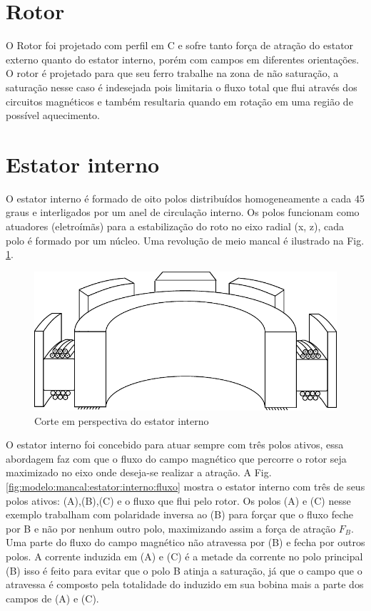 
\section{Rotor}

O Rotor foi projetado com perfil em C e sofre tanto força de atração do estator externo quanto do estator interno, porém com campos em diferentes orientações. O rotor é projetado para que seu ferro trabalhe na zona de não saturação, a saturação nesse caso é indesejada pois limitaria o fluxo total que flui através dos circuitos magnéticos e também resultaria quando em rotação em uma região de possível aquecimento.

\section{Estator interno}

O estator interno é formado de oito polos distribuídos homogeneamente a cada 45 graus e interligados por um anel de circulação interno. Os polos funcionam como atuadores (eletroímãs) para a estabilização do roto no eixo radial (x, z),  cada polo é formado por um núcleo. Uma revolução de meio mancal é ilustrado na Fig. \ref{fig:modelo:mancal:estator:interno}. 

\begin{figure}[ht!]
	\centering
	\includegraphics[width=1\linewidth]{./Figs/modelo_mancal_estator_interno}
	\caption{Corte em perspectiva do estator interno}
	\label{fig:modelo:mancal:estator:interno}
\end{figure}

O estator interno foi concebido para atuar sempre com três polos ativos, essa abordagem faz com que o fluxo do campo magnético que percorre o rotor seja maximizado no eixo onde deseja-se realizar a atração. A Fig. \ref{fig:modelo:mancal:estator:interno:fluxo} mostra o estator interno com três de seus polos ativos: (A),(B),(C) e o fluxo que flui pelo rotor. Os polos (A) e (C) nesse exemplo trabalham com polaridade inversa ao (B) para forçar que o fluxo feche por B e não por nenhum outro polo, maximizando assim a força de atração $F_B$. Uma parte do fluxo do campo magnético não atravessa por (B) e fecha por outros polos. A corrente induzida em (A) e (C) é a metade da corrente no polo principal (B) isso é feito para evitar que o polo B atinja a saturação, já que o campo que o atravessa é composto pela totalidade do induzido em sua bobina mais a parte dos campos de (A) e (C).

